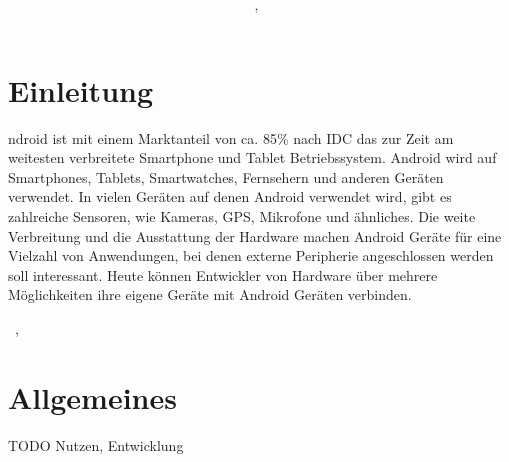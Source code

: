 \documentclass[12pt,journal,compsoc]{IEEEtran}
\begin{document}
\title{\paperTitle \\ \paperSubTitle }
\author{\paperAuthor,~}%



\maketitle

\section{Einleitung}


ndroid ist mit einem Marktanteil von ca. 85\% nach IDC das zur Zeit am weitesten verbreitete Smartphone und Tablet Betriebssystem.\cite{marketshare}
Android wird auf Smartphones, Tablets, Smartwatches, Fernsehern und anderen Geräten verwendet.
In vielen Geräten auf denen Android verwendet wird, gibt es zahlreiche Sensoren, wie Kameras, GPS, Mikrofone und ähnliches.
Die weite Verbreitung und die Ausstattung der Hardware machen Android Geräte für eine Vielzahl von Anwendungen, bei denen externe Peripherie angeschlossen werden soll interessant.
Heute können Entwickler von Hardware über mehrere Möglichkeiten ihre eigene Geräte mit Android Geräten verbinden.


\hfill{\the\day~\Monat, \the\year  }

\section{Allgemeines}
TODO Nutzen, Entwicklung
\end{document}
